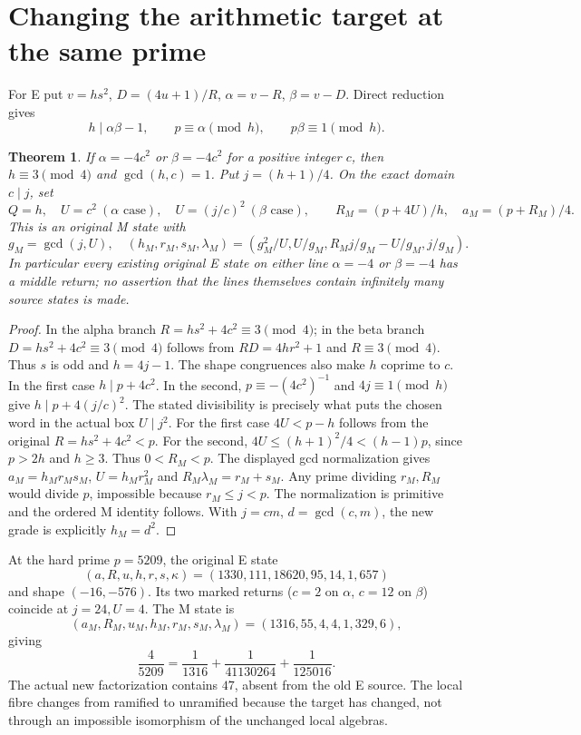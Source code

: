 \documentclass[11pt,reqno]{amsart}
\newtheorem{theorem}{Theorem}\newtheorem{lemma}[theorem]{Lemma}
\begin{document}
\section{Changing the arithmetic target at the same prime}
For E put $v=hs^2$, $D=(4u+1)/R$, $\alpha=v-R$, $\beta=v-D$. Direct reduction gives
\[
 h\mid\alpha\beta-1,\qquad p\equiv\alpha\pmod h,
 \qquad p\beta\equiv1\pmod h.
\]
\begin{theorem}\label{thm:transfer}
If $\alpha=-4c^2$ or $\beta=-4c^2$ for a positive integer $c$, then
$h\equiv3\pmod4$ and $\gcd(h,c)=1$. Put $j=(h+1)/4$.
On the exact domain $c\mid j$, set
\[
 Q=h,\quad U=c^2\ (\alpha\text{ case}),\quad
 U=(j/c)^2\ (\beta\text{ case}),\qquad
 R_M=(p+4U)/h,\quad a_M=(p+R_M)/4.
\]
This is an original M state with
\[
 g_M=\gcd(j,U),\quad
 (h_M,r_M,s_M,\lambda_M)=
 (g_M^2/U,U/g_M,R_Mj/g_M-U/g_M,j/g_M).
\]
 In particular every existing original E state on either line
 $\alpha=-4$ or $\beta=-4$ has a middle return; no assertion that the lines
 themselves contain infinitely many source states is made.
\end{theorem}
\begin{proof}
 In the alpha branch $R=hs^2+4c^2\equiv3\pmod4$; in the beta branch
 $D=hs^2+4c^2\equiv3\pmod4$ follows from $RD=4hr^2+1$ and
 $R\equiv3\pmod4$.  Thus $s$ is odd and $h=4j-1$.  The shape congruences
 also make $h$ coprime to $c$. In the first case $h\mid p+4c^2$.
In the second, $p\equiv-(4c^2)^{-1}$ and $4j\equiv1\pmod h$ give
$h\mid p+4(j/c)^2$. The stated divisibility is precisely what puts the
chosen word in the actual box $U\mid j^2$.
For the first case $4U<p-h$ follows from the original $R=hs^2+4c^2<p$.
For the second, $4U\le(h+1)^2/4<(h-1)p$, since $p>2h$ and $h\ge3$.
Thus $0<R_M<p$. The displayed gcd normalization gives $a_M=h_Mr_Ms_M$,
$U=h_Mr_M^2$ and $R_M\lambda_M=r_M+s_M$.
Any prime dividing $r_M,R_M$ would divide $p$, impossible because $r_M\le j<p$.
The normalization is primitive and the ordered M identity follows. With
$j=cm$, $d=\gcd(c,m)$, the new grade is explicitly $h_M=d^2$.
\end{proof}

At the hard prime $p=5209$, the original E state
\[
 (a,R,u,h,r,s,\kappa)=(1330,111,18620,95,14,1,657)
\]
and shape \((-16,-576)\). Its two marked returns (\(c=2\) on \(\alpha\),
\(c=12\) on \(\beta\)) coincide at \(j=24,U=4\). The M state is
\[
 (a_M,R_M,u_M,h_M,r_M,s_M,\lambda_M)
 =(1316,55,4,4,1,329,6),
\]
giving
\[
 \frac4{5209}=\frac1{1316}+\frac1{41130264}+\frac1{125016}.
\]
The actual new factorization contains $47$, absent from the old E source. The
local fibre changes from ramified to unramified because the target has changed,
not through an impossible isomorphism of the unchanged local algebras.
\end{document}
